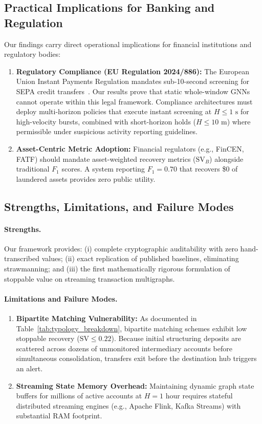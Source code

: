 \documentclass[pdflatex,sn-mathphys,Numbered]{sn-jnl}
\theoremstyle{thmstyleone}
\theoremstyle{thmstyletwo}
\theoremstyle{thmstylethree}
\begin{document}
\subsection{Practical Implications for Banking and Regulation}
Our findings carry direct operational implications for financial institutions and regulatory bodies:
\begin{enumerate}
    \item \textbf{Regulatory Compliance (EU Regulation 2024/886):} The European Union Instant Payments Regulation mandates sub-10-second screening for SEPA credit transfers~\cite{eu2024instant}. Our results prove that static whole-window GNNs cannot operate within this legal framework. Compliance architectures must deploy multi-horizon policies that execute instant screening at $H \le 1\text{ s}$ for high-velocity bursts, combined with short-horizon holds ($H \le 10\text{ m}$) where permissible under suspicious activity reporting guidelines.
    \item \textbf{Asset-Centric Metric Adoption:} Financial regulators (e.g., FinCEN, FATF) should mandate asset-weighted recovery metrics ($\text{SV}_B$) alongside traditional $F_1$ scores. A system reporting $F_1 = 0.70$ that recovers \$0 of laundered assets provides zero public utility.
\end{enumerate}

\subsection{Strengths, Limitations, and Failure Modes}
\paragraph{Strengths.} Our framework provides: (i) complete cryptographic auditability with zero hand-transcribed values; (ii) exact replication of published baselines, eliminating strawmanning; and (iii) the first mathematically rigorous formulation of stoppable value on streaming transaction multigraphs.

\paragraph{Limitations and Failure Modes.}
\begin{enumerate}
    \item \textbf{Bipartite Matching Vulnerability:} As documented in Table~\ref{tab:typology_breakdown}, bipartite matching schemes exhibit low stoppable recovery ($\text{SV} \le 0.22$). Because initial structuring deposits are scattered across dozens of unmonitored intermediary accounts before simultaneous consolidation, transfers exit before the destination hub triggers an alert.
    \item \textbf{Streaming State Memory Overhead:} Maintaining dynamic graph state buffers for millions of active accounts at $H=1\text{ hour}$ requires stateful distributed streaming engines (e.g., Apache Flink, Kafka Streams) with substantial RAM footprint.
\end{enumerate}
\end{document}
